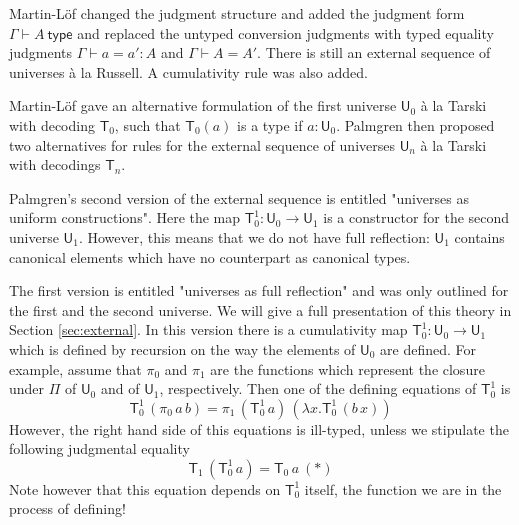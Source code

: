 \documentclass[11pt,a4paper]{article}
\def\UU{\mathsf{U}}
\newcommand{\type}{\mathsf{type}}
\newcommand{\T}{\mathsf{T}}
\begin{document}
Martin-Löf \cite{martinlof:hannover} changed the judgment structure and added the judgment form $\Gamma \vdash A\ \type$
and replaced the untyped conversion judgments with typed equality judgments $\Gamma \vdash a = a' : A$ and $\Gamma \vdash A = A'$. There is still an external sequence of universes \`a la Russell. A cumulativity rule was also added.

Martin-Löf \cite{martinlof:padova} gave an alternative formulation of the first universe $\UU_0$ \`a la Tarski with decoding $\T_0$, such that $\T_0(a)$ is a type if $a : \UU_0$. 
Palmgren \cite{palmgren:venice} then proposed two alternatives for rules for the external sequence of universes $\UU_n$ \`a la Tarski with decodings $\T_n$. 

Palmgren's second version of the external sequence is entitled "universes as uniform constructions". Here the map $\T_0^1 : \UU_0 \to \UU_1$ is a constructor for the second universe $\UU_1$. However, this means that we do not have full reflection: $\UU_1$ contains canonical elements which have no counterpart as canonical types.

The first version is entitled "universes as full reflection" and was only outlined for the first and the second universe. We will give a full presentation of this theory in Section \ref{sec:external}. In this version there is a cumulativity map $\T_0^1 : \UU_0 \to \UU_1$ which is defined by recursion on the way the elements of $\UU_0$ are defined. For example, assume that $\pi_0$ and $\pi_1$ are the functions which represent the closure under $\Pi$ of $\UU_0$ and of $\UU_1$, respectively. Then one of the defining equations of $\T_0^1$ is
$$
\T_0^1\, (\pi_0\,a\, b) = \pi_1\,(\T_0^1\,a)\,(\lambda x.\T_0^1\,(b\,x))
$$
However, the right hand side of this equations is ill-typed, unless we stipulate the following judgmental equality
$$
\T_1\, (\T_0^1\, a) = \T_0\, a\ (*)
$$
Note however that this equation depends on $\T_0^1$ itself, the function we are in the process of defining! 
\end{document}
